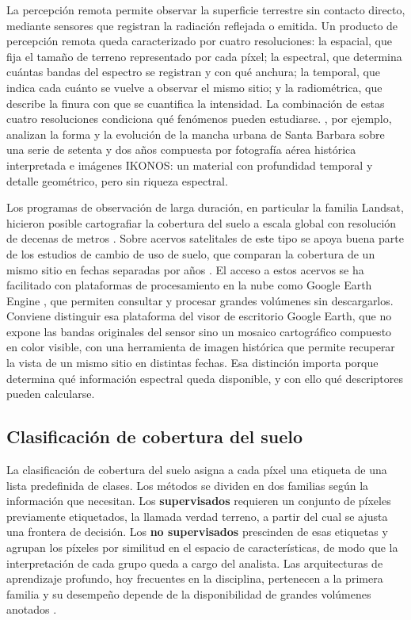 La percepción remota permite observar la superficie terrestre sin contacto directo, mediante sensores que registran la radiación reflejada o emitida. Un producto de percepción remota queda caracterizado por cuatro resoluciones: la espacial, que fija el tamaño de terreno representado por cada píxel; la espectral, que determina cuántas bandas del espectro se registran y con qué anchura; la temporal, que indica cada cuánto se vuelve a observar el mismo sitio; y la radiométrica, que describe la finura con que se cuantifica la intensidad. La combinación de estas cuatro resoluciones condiciona qué fenómenos pueden estudiarse. \textcite{Herold2003}, por ejemplo, analizan la forma y la evolución de la mancha urbana de Santa Barbara sobre una serie de setenta y dos años compuesta por fotografía aérea histórica interpretada e imágenes IKONOS: un material con profundidad temporal y detalle geométrico, pero sin riqueza espectral.

Los programas de observación de larga duración, en particular la familia Landsat, hicieron posible cartografiar la cobertura del suelo a escala global con resolución de decenas de metros \parencite{Gong2013}. Sobre acervos satelitales de este tipo se apoya buena parte de los estudios de cambio de uso de suelo, que comparan la cobertura de un mismo sitio en fechas separadas por años \parencite{Weng2002}. El acceso a estos acervos se ha facilitado con plataformas de procesamiento en la nube como Google Earth Engine \parencite{Gorelick2017}, que permiten consultar y procesar grandes volúmenes sin descargarlos. Conviene distinguir esa plataforma del visor de escritorio Google Earth, que no expone las bandas originales del sensor sino un mosaico cartográfico compuesto en color visible, con una herramienta de imagen histórica que permite recuperar la vista de un mismo sitio en distintas fechas. Esa distinción importa porque determina qué información espectral queda disponible, y con ello qué descriptores pueden calcularse.

\subsection{Clasificación de cobertura del suelo}

La clasificación de cobertura del suelo asigna a cada píxel una etiqueta de una lista predefinida de clases. Los métodos se dividen en dos familias según la información que necesitan. Los \textbf{supervisados} requieren un conjunto de píxeles previamente etiquetados, la llamada verdad terreno, a partir del cual se ajusta una frontera de decisión. Los \textbf{no supervisados} prescinden de esas etiquetas y agrupan los píxeles por similitud en el espacio de características, de modo que la interpretación de cada grupo queda a cargo del analista. Las arquitecturas de aprendizaje profundo, hoy frecuentes en la disciplina, pertenecen a la primera familia y su desempeño depende de la disponibilidad de grandes volúmenes anotados \parencite{Ma2019}.

